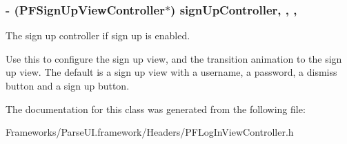 \subsubsection[{sign\+Up\+Controller}]{\setlength{\rightskip}{0pt plus 5cm}-\/ ({\bf P\+F\+Sign\+Up\+View\+Controller}$\ast$) sign\+Up\+Controller\hspace{0.3cm}{\ttfamily [read]}, {\ttfamily [write]}, {\ttfamily [nonatomic]}, {\ttfamily [strong]}}\label{interface_p_f_log_in_view_controller_a3b23bb61ef95e3e9418f2f6d29420425}
The sign up controller if sign up is enabled.

Use this to configure the sign up view, and the transition animation to the sign up view. The default is a sign up view with a username, a password, a dismiss button and a sign up button. 

The documentation for this class was generated from the following file\+:\begin{DoxyCompactItemize}
\item 
Frameworks/\+Parse\+U\+I.\+framework/\+Headers/P\+F\+Log\+In\+View\+Controller.\+h\end{DoxyCompactItemize}
